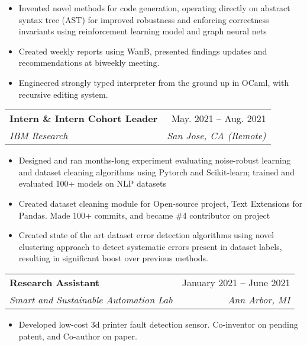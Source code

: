 \documentclass[letterpaper,11pt]{article}
\makeatletter
\newcommand{\resumeItem}[1]{
  \item\small{
    {#1 \vspace{-2pt}}
  }
}
\newcommand{\resumeSubheading}[4]{
  \vspace{-2pt}\item
    \begin{tabular*}{0.97\textwidth}[t]{l@{\extracolsep{\fill}}r}
      \textbf{#1} & #2 \\
      \textit{\small#3} & \textit{\small #4} \\
    \end{tabular*}\vspace{-7pt}
}
\newcommand{\resumeItemListStart}{\begin{itemize}}
\newcommand{\resumeItemListEnd}{\end{itemize}\vspace{-5pt}}
\makeatother
\begin{document}
    \resumeItemListStart
        \resumeItem{
Invented novel methods for code generation, operating directly on abstract syntax tree (AST) for improved robustness and enforcing correctness invariants using reinforcement learning model and graph neural nets 
            }   
        \resumeItem{
Created weekly reports using WanB, presented findings updates and recommendations at biweekly meeting. 
        }
       \resumeItem{Engineered strongly typed interpreter from the ground up in OCaml, with recursive editing system.}

    \resumeItemListEnd

    \resumeSubheading
    {Intern \& Intern Cohort Leader}
     {May. 2021 -- Aug. 2021}
     {IBM Research}
     {San Jose, CA (Remote)}

    \resumeItemListStart
        \resumeItem{Designed and ran months-long experiment evaluating noise-robust learning and dataset cleaning algorithms using Pytorch and Scikit-learn; trained and evaluated 100+ models on NLP datasets}
        \resumeItem{Created dataset cleaning module for Open-source project, Text Extensions for Pandas. Made 100+ commits, and became \#4 contributor on project}
        \resumeItem{Created state of the art dataset error detection algorithms using novel clustering approach to detect systematic errors present in dataset labels, resulting in significant boost over previous methods.}
        
    \resumeItemListEnd

\resumeSubheading{Research Assistant}
        {January 2021 – June 2021}
        {Smart and Sustainable Automation Lab}
        {Ann Arbor, MI}
        
    \resumeItemListStart
        \resumeItem{Developed low-cost 3d printer fault detection sensor. Co-inventor on pending patent, and Co-author on paper.}
    \resumeItemListEnd
\end{document}
